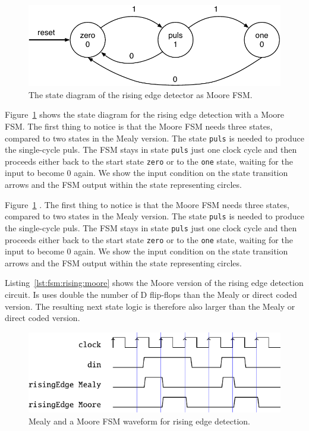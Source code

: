 \documentclass[%
    10pt,
    headinclude, footexclude,
    openright, %
    notitlepage,
    cleardoubleempty,
    headsepline,
    pointlessnumbers,
    bibtotoc, idxtotoc,
    ]{scrbook}
\newcommand{\code}[1]{{\small{\texttt{#1}}}}
\newcommand{\scale}{0.7}
\begin{document}
\begin{figure}
  \centering
  \includegraphics[scale=\scale]{figures/state-diag-rising-moore}
  \caption{The state diagram of the rising edge detector as Moore FSM.}
  \label{fig:diag:rising:moore}
\end{figure}

Figure~\ref{fig:diag:rising:moore} shows the state diagram for the rising
edge detection with a Moore FSM. The first thing to notice is that the Moore FSM
needs three states, compared to two states in the Mealy version.
The state \code{puls} is needed to produce the single-cycle puls.
The FSM stays in state \code{puls} just one clock cycle and then
proceeds either back to the start state \code{zero} or to the \code{one}
state, waiting for the input to become 0 again.
We show the input condition on the state transition arrows and the
FSM output within the state representing circles.

Figure~\ref{fig:diag:rising:moore} . The first thing to notice is that the Moore FSM
needs three states, compared to two states in the Mealy version.
The state \code{puls} is needed to produce the single-cycle puls.
The FSM stays in state \code{puls} just one clock cycle and then
proceeds either back to the start state \code{zero} or to the \code{one}
state, waiting for the input to become 0 again.
We show the input condition on the state transition arrows and the
FSM output within the state representing circles.


Listing~\ref{lst:fsm:rising:moore} shows the Moore version of the rising edge detection
circuit. Is uses double the number of D flip-flops than the Mealy or direct
coded version. The resulting next state logic is therefore also larger
than the Mealy or direct coded version.

\begin{figure}
  \centering
  \includegraphics[scale=1]{figures/rising}
  \caption{Mealy and a  Moore FSM waveform for rising edge detection.}
  \label{fig:rising}
\end{figure}
\end{document}
